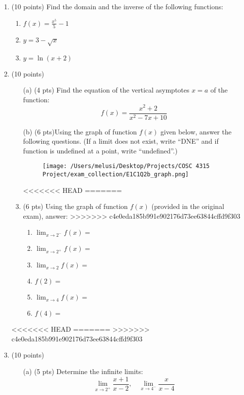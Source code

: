 \begin{enumerate}
    \item (10 points) Find the domain and the inverse of the following functions:
    \begin{enumerate}
        \item \( f(x) = \frac{x^5}{5} - 1 \)
        \item \( y = 3 - \sqrt{x} \)
        \item \( y = \ln(x + 2) \)
    \end{enumerate}

\item (10 points)
\begin{enumerate}
    \item[(a)] (4 pts) Find the equation of the vertical asymptotes \(x = a\) of the function:  
    \[
    f(x) = \frac{x^2 + 2}{x^2 - 7x + 10}
    \]
    \item[(b)] (6 pts)Using the graph of function \( f(x) \) given below, answer the following questions.
        (If a limit does not exist, write “DNE” and if function is undefined at a point, write “undefined”.)
    \begin{figure}[ht!]
        \centering
        \texttt{[image: /Users/melusi/Desktop/Projects/COSC 4315 Project/exam\_collection/E1C1Q2b\_graph.png]}
    \end{figure}

<<<<<<< HEAD
=======
    \item (6 pts) Using the graph of function \( f(x) \) (provided in the original exam), answer:
>>>>>>> c4e0eda185b991e902176d73ee63844cffd9f303
        \begin{enumerate}
            \item \( \lim_{x \to 2^-} f(x) = \)
            \item \( \lim_{x \to 2^+} f(x) = \)
            \item \( \lim_{x \to 2} f(x) = \)
            \item \( f(2) = \)
            \item \( \lim_{x \to 4} f(x) = \)
            \item \( f(4) = \)
        \end{enumerate}
    \end{enumerate}

<<<<<<< HEAD
=======
>>>>>>> c4e0eda185b991e902176d73ee63844cffd9f303
    \item (10 points)
    \begin{enumerate}
        \item [(a)] (5 pts) Determine the infinite limits:
        \[
        \lim_{x \to 2^+} \frac{x + 1}{x - 2}, \quad 
        \lim_{x \to 4^-} \frac{x}{x - 4}
        \]


\end{enumerate}
\end{enumerate}
